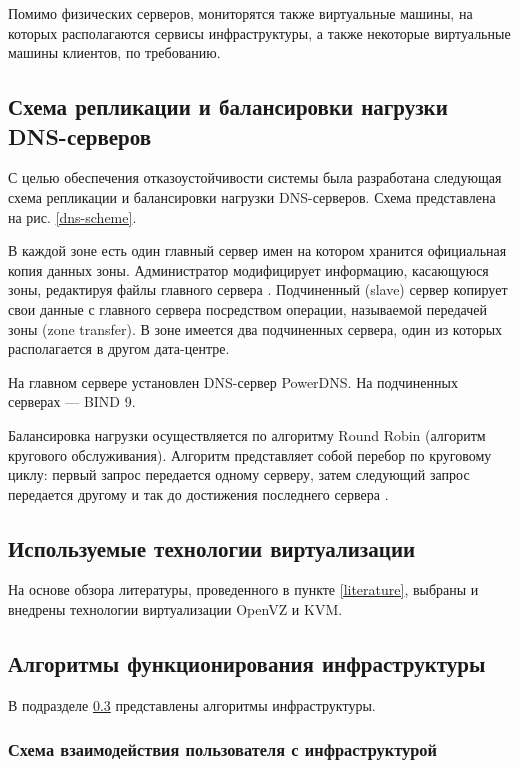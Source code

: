 Помимо физических серверов, мониторятся также виртуальные машины, на которых располагаются сервисы инфраструктуры, а также некоторые виртуальные машины клиентов, по требованию.

\subsection{Схема репликации и балансировки нагрузки DNS-серверов}

С целью обеспечения отказоустойчивости системы была разработана следующая схема репликации и балансировки нагрузки DNS-серверов.
Схема представлена на рис. \ref{dns-scheme}.

В каждой зоне есть один главный сервер имен на котором хранится официальная копия данных зоны.
Администратор модифицирует информацию, касающуюся зоны, редактируя файлы главного сервера \cite{unix-handbook}.
Подчиненный (slave) сервер копирует свои данные с главного сервера посредством операции, называемой передачей зоны (zone transfer).
В зоне имеется два подчиненных сервера, один из которых располагается в другом дата-центре.

На главном сервере установлен DNS-сервер PowerDNS.
На подчиненных серверах --- BIND 9.

Балансировка нагрузки осуществляется по алгоритму Round Robin (алгоритм кругового обслуживания).
Алгоритм представляет собой перебор по круговому циклу: первый запрос передается одному серверу, затем следующий запрос передается другому и так до достижения последнего сервера \cite{selectel}.

\subsection{Используемые технологии виртуализации}

На основе обзора литературы, проведенного в пункте \ref{literature}, выбраны и внедрены технологии виртуализации OpenVZ и KVM.

\subsection{Алгоритмы функционирования инфраструктуры} \label{algo}

В подразделе \ref{algo} представлены алгоритмы инфраструктуры.

\subsubsection{Схема взаимодействия пользователя с инфраструктурой}

